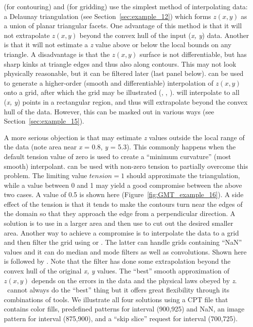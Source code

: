  (for contouring) and 
(for gridding) use the simplest method of interpolating
data:  a Delaunay triangulation (see Section~\ref{sec:example_12}) which
forms $z(x, y)$ as a union of planar triangular facets.
One advantage of this method is that it will not extrapolate
$z(x, y)$ beyond the convex hull of the input (\emph{x, y})
data.  Another is that it will not estimate a \emph{z} value
above or below the local bounds on any triangle.
A disadvantage is that the $z(x, y)$ surface is not
differentiable, but has sharp kinks at triangle edges and
thus also along contours.  This may not look physically
reasonable, but it can be filtered later (last panel below).
 can be used to generate a higher-order
(smooth and differentiable) interpolation of $z(x, y)$ onto
a grid, after which the grid may be illustrated (,
, ).   will interpolate
to all (\emph{x, y}) points in a rectangular region, and thus
will extrapolate beyond the convex hull of the data.  However,
this can be masked out in various ways (see Section~\ref{sec:example_15}).

A more serious objection is that  may estimate
\emph{z} values outside the local range of the data (note area
near \emph{x} = 0.8, \emph{y} = 5.3).  This commonly happens when
the default tension value of zero is used to create a ``minimum
curvature'' (most smooth) interpolant.   can be
used with non-zero tension to partially  overcome this problem.
The limiting value $tension = 1$ should approximate the triangulation,
while a value between 0 and 1 may yield a good compromise between
the above two cases.  A value of 0.5 is shown here
(Figure~\ref{fig:GMT_example_16}).  A side
effect of the tension is that it tends to make the contours turn
near the edges of the domain so that they approach the edge from
a perpendicular direction.  A solution is to use 
in a larger area and then use  to cut out the desired
smaller area.  Another way to achieve a compromise is to
interpolate the data to a grid and then filter the grid using
 or .  The latter can handle grids
containing ``NaN'' values and it can do  median and mode filters
as well as convolutions.  Shown here is  followed
by .  Note that the filter has done some
extrapolation beyond the convex hull of the original \emph{x, y}
values.  The ``best'' smooth approximation of $z(x, y)$ depends
on the errors in the data and the physical laws obeyed by \emph{z}.
\GMT\ cannot always do the ``best'' thing but it offers great
flexibility through its combinations of tools.  We illustrate all
four solutions using a CPT file that contains color fills,
predefined patterns for interval (900,925) and NaN, an image pattern for interval (875,900),
and a ``skip slice'' request for interval (700,725).

